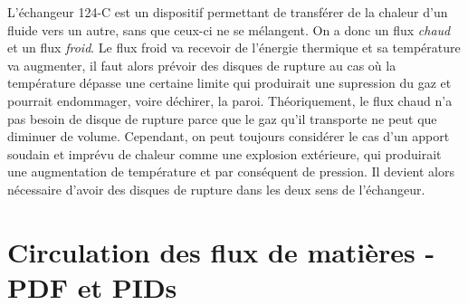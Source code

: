 L'échangeur 124-C est un dispositif permettant de transférer de la chaleur d'un fluide
vers un autre, sans que ceux-ci ne se mélangent.
On a donc un flux \emph{chaud} et un flux \emph{froid}. Le flux froid va recevoir de 
l'énergie thermique et sa température va augmenter, il faut alors prévoir des disques 
de rupture au cas où la température dépasse une certaine limite qui produirait une 
supression du gaz et pourrait endommager, voire déchirer, la paroi.
Théoriquement, le flux chaud n'a pas besoin de disque de rupture parce que le gaz qu'il 
transporte ne peut que diminuer de volume. Cependant, on peut toujours considérer le cas
d'un apport soudain et imprévu de chaleur comme une explosion extérieure, qui produirait
une augmentation de température et par conséquent de pression. 
Il devient alors nécessaire d'avoir des disques de rupture dans les deux sens de l'échangeur.


\section{Circulation des flux de matières - PDF et PIDs}
\label{sec:fluxes}


